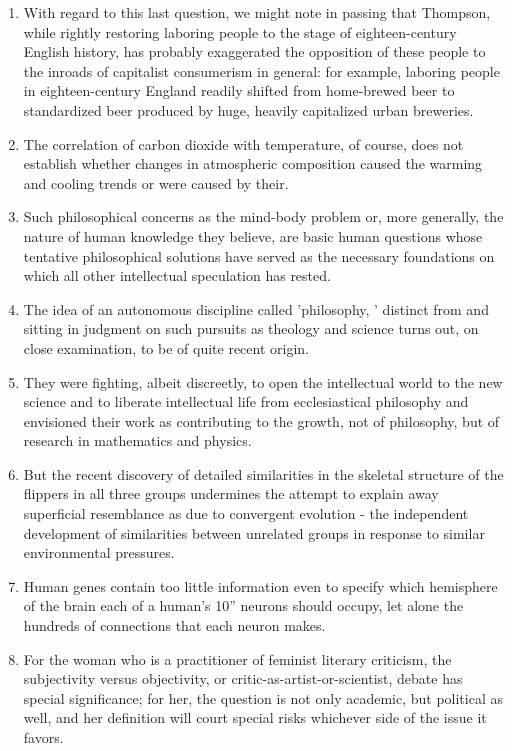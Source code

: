\begin{enumerate}
\item With regard to this last question, we might note in passing that
Thompson, while rightly restoring laboring people to the stage of eighteen-century English history, has probably exaggerated the opposition of these people to the inroads of capitalist consumerism in general:  for example, laboring people in eighteen-century England readily shifted from home-brewed beer to standardized beer produced by huge, heavily capitalized urban breweries.

\item The correlation of carbon dioxide with temperature, of course, does not establish whether changes in atmospheric composition caused the warming and cooling trends or were caused by their.

\item Such philosophical concerns as the mind-body problem or, more generally, the nature of  human knowledge they believe, are basic human questions whose tentative philosophical solutions have served as the necessary foundations on which all other intellectual speculation has rested. 

\item The idea of an autonomous discipline called 'philosophy, ' distinct from
and sitting in judgment on such pursuits as theology and science turns out,  on close examination, to be of quite recent origin. 

\item They were fighting, albeit discreetly, to open the intellectual world to the new science and to liberate intellectual life from ecclesiastical philosophy and envisioned their work as contributing to the growth, not of philosophy, but of research in mathematics and physics.

\item But the recent discovery of detailed similarities in the skeletal structure of
the flippers in all three groups undermines the attempt to explain away superficial resemblance as due to convergent  evolution  -  the independent development of similarities between unrelated groups in response to similar environmental pressures. 

\item Human genes contain too little information even to specify which
hemisphere of the brain  each of a human's 10'' neurons should occupy, let alone the hundreds of connections that each neuron makes.

\item For the woman who is a practitioner of feminist literary criticism, the
subjectivity versus objectivity, or critic-as-artist-or-scientist, debate has special significance; for her, the question is not only academic, but political as well, and her definition will court special risks whichever side of the issue it favors.


\end{enumerate}
